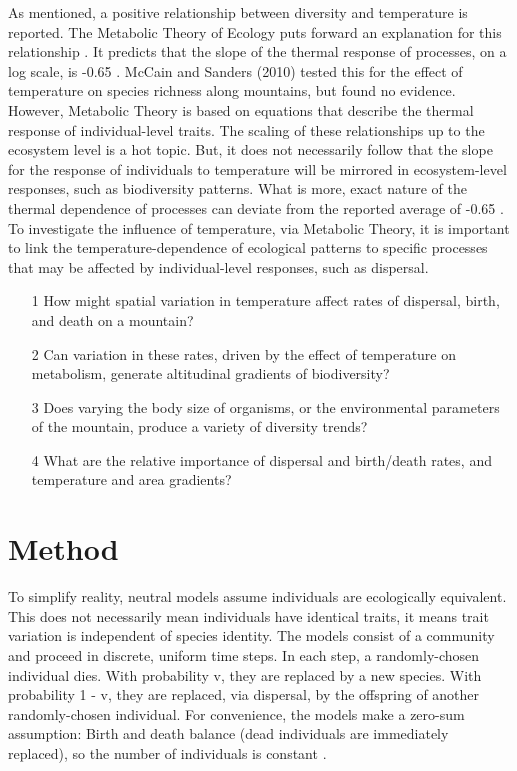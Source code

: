 \documentclass[11pt]{article}
\begin{document}
As mentioned, a positive relationship between diversity and temperature is reported. The Metabolic Theory of Ecology puts forward an explanation for this relationship \cite{brown2004toward}. It predicts that the slope of the thermal response of processes, on a log scale, is -0.65 \cite{allen2006kinetic}. McCain and Sanders (2010) tested this for the effect of temperature on species richness along mountains, but found no evidence. However, Metabolic Theory is based on equations that describe the thermal response of individual-level traits. The scaling of these relationships up to the ecosystem level is a hot topic. But, it does not necessarily follow that the slope for the response of individuals to temperature will be mirrored in ecosystem-level responses, such as biodiversity patterns. What is more, exact nature of the thermal dependence of processes can deviate from the reported average of -0.65 \cite{dell2011systematic}. To investigate the influence of temperature, via Metabolic Theory, it is important to link the temperature-dependence of ecological patterns to specific processes that may be affected by individual-level responses, such as dispersal.

\begin{enumerate}
\item[1] How might spatial variation in temperature affect rates of dispersal, birth, and death on a mountain?
\item[2] Can variation in these rates, driven by the effect of temperature on metabolism, generate altitudinal gradients of biodiversity?
\item[3] Does varying the body size of organisms, or the environmental parameters of the mountain, produce a variety of diversity trends?
\item[4] What are the relative importance of dispersal and birth/death rates, and temperature and area gradients?
\end{enumerate}

\section*{Method}
To simplify reality, neutral models assume individuals are ecologically equivalent. This does not necessarily mean individuals have identical traits, it means trait variation is independent of species identity. The models consist of a community and proceed in discrete, uniform time steps. In each step, a randomly-chosen individual dies. With probability v, they are replaced by a new species. With probability 1 - v, they are replaced, via dispersal, by the offspring of another randomly-chosen individual. For convenience, the models make a zero-sum assumption: Birth and death balance (dead individuals are immediately replaced), so the number of individuals is constant \cite{HubbellStephenP2011UNTo, rosindell2008coalescence, rosindell2011unified}.
\end{document}
